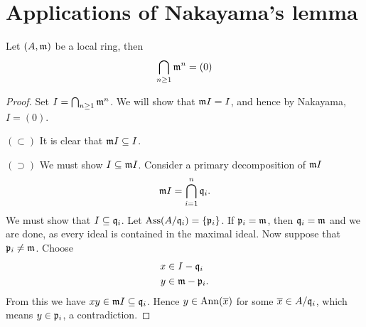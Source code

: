 \documentclass{ximera}
\begin{document}
\section{Applications of Nakayama's lemma}

\begin{corollary}\label{C:intmax}
  Let $(A,\mathfrak{m})$ be a local ring, then
  \[
  \bigcap_{n\ge 1} \mathfrak{m}^n  = (0)
  \]
  \begin{proof}
    Set $I = \bigcap_{n\ge 1} \mathfrak{m}^n$. We will show that $\mathfrak{m} I = I$, and
    hence by Nakayama, $I = (0)$.

    $(\subset)$ It is clear that $\mathfrak{m} I \subseteq I$.

    $(\supset)$ We must show $I\subseteq \mathfrak{m} I$. Consider a primary
    decomposition of $\mathfrak{m} I$
    \[
    \mathfrak{m} I = \bigcap_{i=1}^n \mathfrak{q}_i.
    \]
    We must show that $I\subseteq\mathfrak{q}_i$.  Let $\operatorname{Ass}(A/\mathfrak{q}_i) =
    \{\mathfrak{p}_i\}$. If $\mathfrak{p}_i = \mathfrak{m}$, then $\mathfrak{q}_i=\mathfrak{m}$ and we are done, as
    every ideal is contained in the maximal ideal. Now suppose that
    $\mathfrak{p}_i\ne\mathfrak{m}$. Choose
    \begin{align*}
      x &\in I -\mathfrak{q}_i\\
      y &\in \mathfrak{m} - \mathfrak{p}_i.
    \end{align*}
    From this we have $xy\in\mathfrak{m} I \subseteq \mathfrak{q}_i$. Hence $y\in\operatorname{Ann}(\overline{x})$
    for some $\overline{x}\in A/\mathfrak{q}_i$, which means $y\in \mathfrak{p}_i$, a contradiction.
  \end{proof}
\end{corollary}
\end{document}
